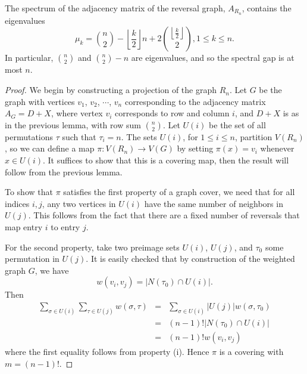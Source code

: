 \begin{lemma}\label{lem:rev_eig2}
  The spectrum of the adjacency matrix of the reversal graph, $A_{R_n}$, 
  contains the eigenvalues
\[ \mu_k =  \binom{n}{2} - \left\lfloor \frac{k}{2} \right\rfloor n + 2 \binom{\left \lfloor \frac{k}{2} \right \rfloor}{2}, 1 \leq k \leq n . \]
  In particular, $\binom{n}{2}$ and $\binom{n}{2} - n$ are eigenvalues, and so the spectral gap is at most $n$. 
\end{lemma}  

\begin{proof}
  We begin by constructing a projection of the graph $R_n$.
  Let $G$ be the graph with vertices $v_1$, $v_2$, $\cdots$,
  $v_n$ corresponding to the adjacency matrix $A_G = D+X$,
  where vertex $v_i$ corresponds to row and column $i$, and
  $D+X$ is as in the previous lemma, with row sum $\binom{n}{2}$.
  Let $U(i)$ be the set of all permutations $\tau$ such that $\tau_i = n$.
  The sets $U(i)$, for $1\leq i \leq n$, partition $V(R_n)$, so we
  can define a map $\pi : V(R_n) \to V(G)$ by
  setting $\pi(x) = v_i$ whenever $x \in U(i)$.  It suffices to show
  that this is a covering map, then the result will follow
  from the previous lemma.


  To show that $\pi$ satisfies the first property of a graph cover,
  we need that for all indices $i,j$, any two vertices in $U(i)$
  have the same number of neighbors in $U(j)$.  This follows from the
  fact that there are a fixed number of reversals that map
  entry $i$ to entry $j$.



  For the second property, take two preimage sets $U(i)$, $U(j)$,
  and $\tau_0$ some permutation in $U(j)$.  It is easily checked
  that by construction of the weighted graph $G$, we have
  \[ w(v_i, v_j) = \left| N(\tau_0) \cap U(i) \right| .\]
  Then
  \begin{eqnarray*}
    \displaystyle \sum_{\sigma \in U(i)} \sum_{\tau \in U(j)} w(\sigma,\tau) & = & \sum_{\sigma \in U(i)} |U(j)| w(\sigma,\tau_0) \\
    & = & (n-1)! \left| N(\tau_0) \cap U(i) \right|  \\
    & = & (n-1)! w(v_i, v_j)
  \end{eqnarray*}
  where the first equality follows from property (i).
  Hence $\pi$ is a covering with $m = (n-1)!$.


\end{proof}
